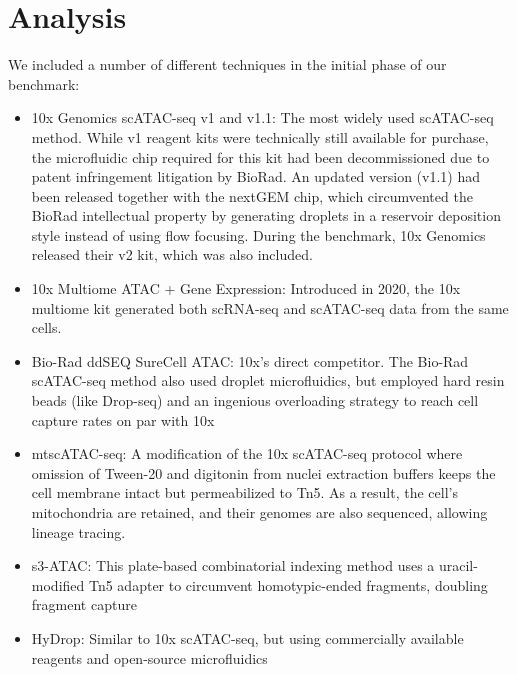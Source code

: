 \section{Analysis}
We included a number of different techniques in the initial phase of our benchmark:

\begin{itemize}[noitemsep]
	\item 10x Genomics scATAC-seq v1 and v1.1: The most widely used scATAC-seq method. While v1 reagent kits were technically still available for purchase, the microfluidic chip required for this kit had been decommissioned due to patent infringement litigation by BioRad. An updated version (v1.1) had been released together with the nextGEM chip, which circumvented the BioRad intellectual property by generating droplets in a reservoir deposition style instead of using flow focusing. During the benchmark, 10x Genomics released their v2 kit, which was also included.
	\item 10x Multiome ATAC + Gene Expression: Introduced in 2020, the 10x multiome kit generated both scRNA-seq and scATAC-seq data from the same cells.
	\item Bio-Rad ddSEQ SureCell ATAC: 10x's direct competitor. The Bio-Rad scATAC-seq method also used droplet microfluidics, but employed hard resin beads (like Drop-seq) and an ingenious overloading strategy to reach cell capture rates on par with 10x
	\item mtscATAC-seq: A modification of the 10x scATAC-seq protocol where omission of Tween-20 and digitonin from nuclei extraction buffers keeps the cell membrane intact but permeabilized to Tn5. As a result, the cell's mitochondria are retained, and their genomes are also sequenced, allowing lineage tracing.
	\item s3-ATAC: This plate-based combinatorial indexing method uses a uracil-modified Tn5 adapter to circumvent homotypic-ended fragments, doubling fragment capture
	\item HyDrop: Similar to 10x scATAC-seq, but using commercially available reagents and open-source microfluidics
\end{itemize}

